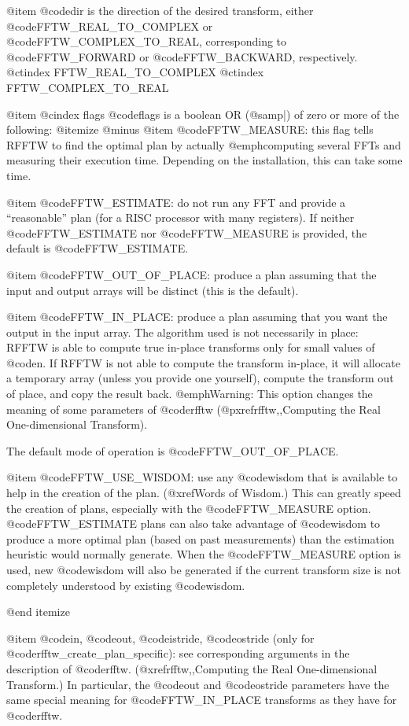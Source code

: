 @item
@code{dir} is the direction of the desired transform, either
@code{FFTW_REAL_TO_COMPLEX} or @code{FFTW_COMPLEX_TO_REAL},
corresponding to @code{FFTW_FORWARD} or @code{FFTW_BACKWARD},
respectively.
@ctindex FFTW_REAL_TO_COMPLEX
@ctindex FFTW_COMPLEX_TO_REAL

@item
@cindex flags
@code{flags} is a boolean OR (@samp{|}) of zero or more of the following:
@itemize @minus
@item
@code{FFTW_MEASURE}: this flag tells RFFTW to find the optimal plan by
actually @emph{computing} several FFTs and measuring their
execution time.  Depending on the installation, this can take some
time.

@item
@code{FFTW_ESTIMATE}: do not run any FFT and provide a ``reasonable''
plan (for a RISC processor with many registers).  If neither
@code{FFTW_ESTIMATE} nor @code{FFTW_MEASURE} is provided, the default is
@code{FFTW_ESTIMATE}.

@item
@code{FFTW_OUT_OF_PLACE}: produce a plan assuming that the input
  and output arrays will be distinct (this is the default).

@item
@code{FFTW_IN_PLACE}: produce a plan assuming that you want the output
in the input array.  The algorithm used is not necessarily in place:
RFFTW is able to compute true in-place transforms only for small values
of @code{n}.  If RFFTW is not able to compute the transform in-place, it
will allocate a temporary array (unless you provide one yourself),
compute the transform out of place, and copy the result back.
@emph{Warning: This option changes the meaning of some parameters of
@code{rfftw}} (@pxref{rfftw,,Computing the Real One-dimensional Transform}).

The default mode of operation is @code{FFTW_OUT_OF_PLACE}.

@item
@code{FFTW_USE_WISDOM}: use any @code{wisdom} that is available to help
in the creation of the plan. (@xref{Words of Wisdom}.)
This can greatly speed the creation of plans, especially with the
@code{FFTW_MEASURE} option. @code{FFTW_ESTIMATE} plans can also take
advantage of @code{wisdom} to produce a more optimal plan (based on past
measurements) than the estimation heuristic would normally
generate. When the @code{FFTW_MEASURE} option is used, new @code{wisdom}
will also be generated if the current transform size is not completely
understood by existing @code{wisdom}.

@end itemize

@item
@code{in}, @code{out}, @code{istride}, @code{ostride} (only for
@code{rfftw_create_plan_specific}): see corresponding arguments in the
description of @code{rfftw}.  (@xref{rfftw,,Computing the Real
One-dimensional Transform}.)  In particular, the @code{out} and
@code{ostride} parameters have the same special meaning for
@code{FFTW_IN_PLACE} transforms as they have for @code{rfftw}.

